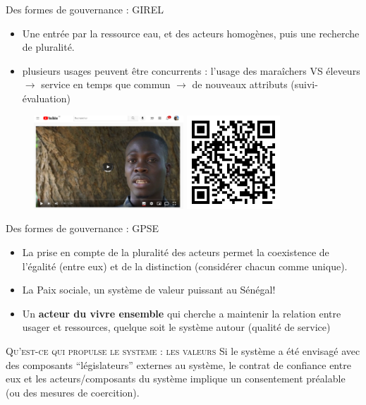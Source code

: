 \documentclass[newPxFont]{beamer}
\begin{document}
\begin{frame}[c]{Des formes de gouvernance : GIREL}
      \vspace{-1cm}
      \begin{itemize}
          \item Une entrée par la ressource eau, et des acteurs homogènes, puis une recherche de pluralité.
          \item plusieurs usages peuvent être concurrents : l’usage des maraîchers VS éleveurs $\rightarrow$ service en temps que commun $\rightarrow$ de nouveaux attributs (suivi-évaluation)
      \end{itemize}
      \begin{figure}
          \includegraphics[height=3.5cm]{img/ComMod_f'eauDiem.png}
          \includegraphics[height=3.5cm]{img/qrcode_feaudiem.png}
      \end{figure}
\end{frame}
      
\begin{frame}[c]{Des formes de gouvernance : GPSE}
    \vspace{-1cm}
      \begin{itemize}
          \item La prise en compte de la pluralité des acteurs permet la coexistence de l’égalité (entre eux) et de la distinction (considérer chacun comme unique).
          \item La Paix sociale, un système de valeur puissant au Sénégal!
          \item Un \textbf{acteur du vivre ensemble} qui cherche a maintenir la relation entre usager et ressources, quelque soit le système autour (qualité de service)
      \end{itemize}
       \small{
         \begin{alertblock}{\textsc{Qu'est-ce qui propulse le systeme : les valeurs }}
          Si le système a été envisagé avec des composants “législateurs” externes au système, le contrat de confiance entre eux et les acteurs/composants du système implique un consentement préalable (ou des mesures de coercition).
         \end{alertblock}
       }
\end{frame}
\end{document}

